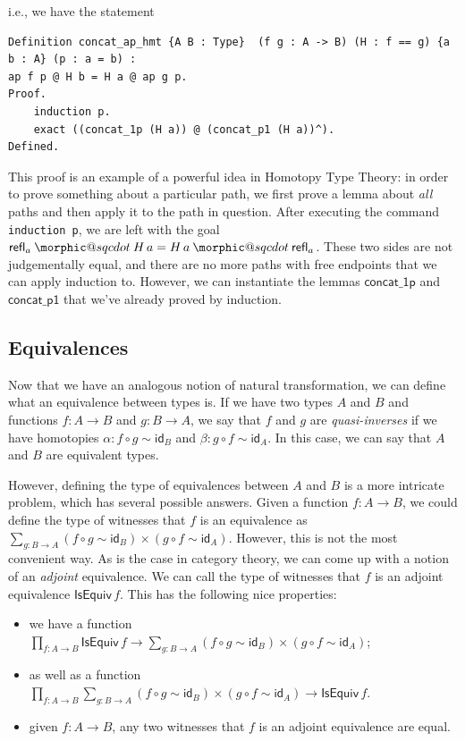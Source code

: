 \documentclass[12 pt]{amsart}
\makeatletter
\theoremstyle{definition}
\theoremstyle{remark}
\newcommand{\refl}{\mathsf{refl}}
\newcommand{\id}{{\mathsf{id}}}
\newcommand{\IsEquiv}{\mathsf{IsEquiv}}
\newcommand{\concatonep}{\mathsf{concat\_1p}}
\newcommand{\concatpone}{\mathsf{concat\_p1}}
\DeclareRobustCommand{\conc}{\mathbin{\mathpalette\morphic@sqcdot\relax}}
\newcommand{\morphic@sqcdot}[2]{%
    \sbox\z@{$\m@th#1\centerdot$}%
    \ht\z@=.33333\ht\z@
    \vcenter{\box\z@}%
    }
\makeatother
\begin{document}
i.e., we have the statement 

\begin{lstlisting}
Definition concat_ap_hmt {A B : Type}  (f g : A -> B) (H : f == g) {a b : A} (p : a = b) :
ap f p @ H b = H a @ ap g p.
Proof.
    induction p.
    exact ((concat_1p (H a)) @ (concat_p1 (H a))^).
Defined.    
\end{lstlisting}

This proof is an example of a powerful idea in Homotopy Type Theory: in order to prove something about a particular path, we first prove a lemma about \textit{all} paths and then apply it to the path in question. After executing the command \texttt{induction p}, we are left with the goal $\refl_a \conc H\,a = H\, a \conc \refl_a$. These two sides are not judgementally equal, and there are no more paths with free endpoints that we can apply induction to. However, we can instantiate the lemmas $\concatonep$ and $\concatpone$ that we've already proved by induction.

\subsection{Equivalences}
\label{subsec:equiv}

Now that we have an analogous notion of natural transformation, we can define what an equivalence between types is. If we have two types $A$ and $B$ and functions $f : A \to B$ and $g : B \to A$, we say that $f$ and $g$ are \textit{quasi-inverses} if we have homotopies $\alpha : f \circ g \sim \id_B$ and $\beta : g \circ f \sim \id_A$. In this case, we can say that $A$ and $B$ are equivalent types. 

However, defining the type of equivalences between $A$ and $B$ is a more intricate problem, which has several possible answers. Given a function $f : A \to B$, we could define the type of witnesses that $f$ is an equivalence as $\sum_{g : B \to A} (f \circ g \sim \id_B) \times (g \circ f \sim \id_A)$. However, this is not the most convenient way. As is the case in category theory, we can come up with a notion of an \textit{adjoint} equivalence. We can call the type of witnesses that $f$ is an adjoint equivalence $\IsEquiv\,f$. This has the following nice properties:

\begin{itemize}
\item we have a function $\prod_{f : A \to B} \IsEquiv \, f \to \sum_{g : B \to A} (f \circ g \sim \id_B) \times (g \circ f \sim \id_A)$;
\item as well as a function $\prod_{f : A \to B} \sum_{g : B \to A} (f \circ g \sim \id_B) \times (g \circ f \sim \id_A) \to \IsEquiv \, f $.
\item given $f : A \to B$, any two witnesses that $f$ is an adjoint equivalence are equal.
\end{itemize}
\end{document}
